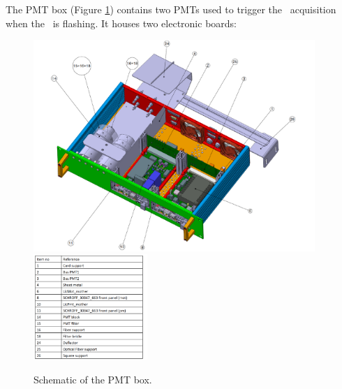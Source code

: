 The PMT box (Figure \ref{fig:laspmtbox}) contains two PMTs \cite{ref:pmt} used to trigger the \lasii~acquisition when the \laser~is flashing. It houses two electronic boards:


\begin{figure}[htbp]
\centering
\includegraphics[height=8cm]{figures/pmtbox_meca.pdf}
\includegraphics[height=4cm]{figures/pmtbox_list.pdf}
\caption{Schematic of the PMT box.}\label{fig:laspmtbox}
\end{figure}

